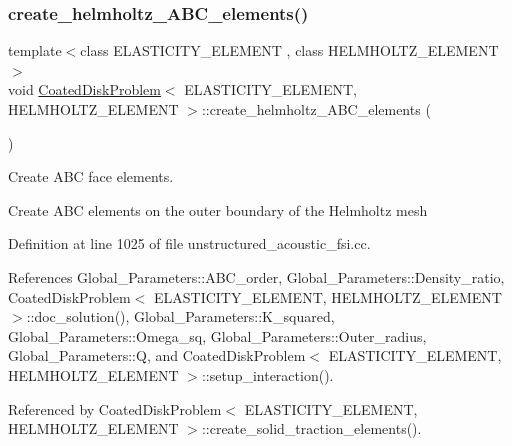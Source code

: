 \subsubsection{\texorpdfstring{create\+\_\+helmholtz\+\_\+\+A\+B\+C\+\_\+elements()}{create\_helmholtz\_ABC\_elements()}}
{\footnotesize\ttfamily template$<$class E\+L\+A\+S\+T\+I\+C\+I\+T\+Y\+\_\+\+E\+L\+E\+M\+E\+NT , class H\+E\+L\+M\+H\+O\+L\+T\+Z\+\_\+\+E\+L\+E\+M\+E\+NT $>$ \\
void \hyperlink{classCoatedDiskProblem}{Coated\+Disk\+Problem}$<$ E\+L\+A\+S\+T\+I\+C\+I\+T\+Y\+\_\+\+E\+L\+E\+M\+E\+NT, H\+E\+L\+M\+H\+O\+L\+T\+Z\+\_\+\+E\+L\+E\+M\+E\+NT $>$\+::create\+\_\+helmholtz\+\_\+\+A\+B\+C\+\_\+elements (\begin{DoxyParamCaption}{ }\end{DoxyParamCaption})\hspace{0.3cm}{\ttfamily [private]}}



Create A\+BC face elements. 

Create A\+BC elements on the outer boundary of the Helmholtz mesh 

Definition at line 1025 of file unstructured\+\_\+acoustic\+\_\+fsi.\+cc.



References Global\+\_\+\+Parameters\+::\+A\+B\+C\+\_\+order, Global\+\_\+\+Parameters\+::\+Density\+\_\+ratio, Coated\+Disk\+Problem$<$ E\+L\+A\+S\+T\+I\+C\+I\+T\+Y\+\_\+\+E\+L\+E\+M\+E\+N\+T, H\+E\+L\+M\+H\+O\+L\+T\+Z\+\_\+\+E\+L\+E\+M\+E\+N\+T $>$\+::doc\+\_\+solution(), Global\+\_\+\+Parameters\+::\+K\+\_\+squared, Global\+\_\+\+Parameters\+::\+Omega\+\_\+sq, Global\+\_\+\+Parameters\+::\+Outer\+\_\+radius, Global\+\_\+\+Parameters\+::Q, and Coated\+Disk\+Problem$<$ E\+L\+A\+S\+T\+I\+C\+I\+T\+Y\+\_\+\+E\+L\+E\+M\+E\+N\+T, H\+E\+L\+M\+H\+O\+L\+T\+Z\+\_\+\+E\+L\+E\+M\+E\+N\+T $>$\+::setup\+\_\+interaction().



Referenced by Coated\+Disk\+Problem$<$ E\+L\+A\+S\+T\+I\+C\+I\+T\+Y\+\_\+\+E\+L\+E\+M\+E\+N\+T, H\+E\+L\+M\+H\+O\+L\+T\+Z\+\_\+\+E\+L\+E\+M\+E\+N\+T $>$\+::create\+\_\+solid\+\_\+traction\+\_\+elements().

\mbox{\label{classCoatedDiskProblem_a222b74395afde602617965f60c885491}} 
